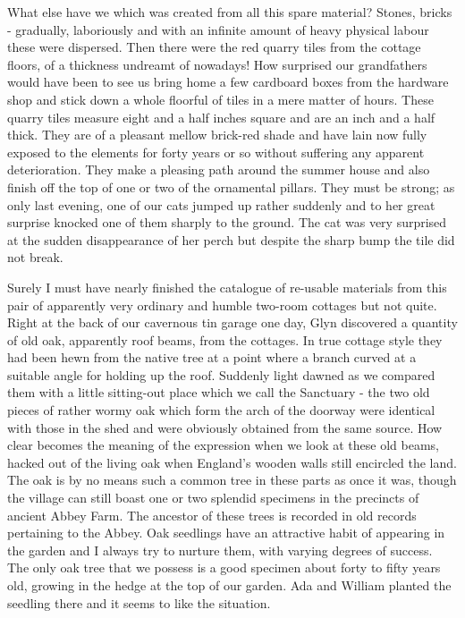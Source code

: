 What else have we which was created from all this spare material? Stones, bricks - gradually, laboriously and with an infinite amount of heavy physical labour these were dispersed. Then there were the red quarry tiles from the cottage floors, of a thickness undreamt of nowadays! How surprised our grandfathers would have been to see us bring home a few cardboard boxes from the hardware shop and stick down a whole floorful of tiles in a mere matter of hours. These quarry tiles measure eight and a half inches square and are an inch and a half thick. They are of a pleasant mellow brick-red shade and have lain now fully exposed to the elements for forty years or so without suffering any apparent deterioration. They make a pleasing path around the summer house and also finish off the top of one or two of the ornamental pillars. They must be strong; as only last evening, one of our cats jumped up rather suddenly and to her great surprise knocked one of them sharply to the ground. The cat was very surprised at the sudden disappearance of her perch but despite the sharp bump the tile did not break.

Surely I must have nearly finished the catalogue of re-usable materials from this pair of apparently very ordinary and humble two-room cottages but not quite. Right at the back of our cavernous tin garage one day, Glyn discovered a quantity of old oak, apparently roof beams, from the cottages. In true cottage style they had been hewn from the native tree at a point where a branch curved at a suitable angle for holding up the roof. Suddenly light dawned as we compared them with a little sitting-out place which we call the Sanctuary - the two old pieces of rather wormy oak which form the arch of the doorway were identical with those in the shed and were obviously obtained from the same source. How clear becomes the meaning of the expression  when we look at these old beams, hacked out of the living oak when England's wooden walls still encircled the land. The oak is by no means such a common tree in these parts as once it was, though the village can still boast one or two splendid specimens in the precincts of ancient Abbey Farm. The ancestor of these trees is recorded in old records pertaining to the Abbey. Oak seedlings have an attractive habit of appearing in the garden and I always try to nurture them, with varying degrees of success. The only oak tree that we possess is a good specimen about forty to fifty years old, growing in the hedge at the top of our garden. Ada and William planted the seedling there and it seems to like the situation.


